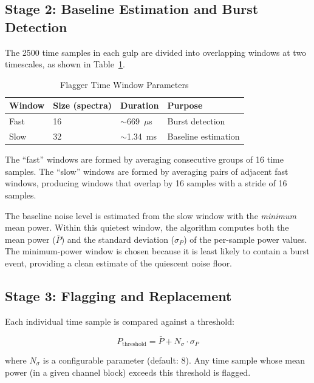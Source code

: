 \subsection{Stage 2: Baseline Estimation and Burst Detection}

The 2500 time samples in each gulp are divided into overlapping windows at two timescales, as shown in Table~\ref{tab:flagger-windows}.

\begin{table}[htbp]
    \centering
    \caption{Flagger Time Window Parameters}
    \label{tab:flagger-windows}
    \begin{tabular}{llll}
        \toprule
        \textbf{Window} & \textbf{Size (spectra)} & \textbf{Duration} & \textbf{Purpose} \\
        \midrule
        Fast & 16 & $\sim$669~$\mu$s & Burst detection \\
        Slow & 32 & $\sim$1.34~ms & Baseline estimation \\
        \bottomrule
    \end{tabular}
\end{table}

The ``fast'' windows are formed by averaging consecutive groups of 16 time samples. The ``slow'' windows are formed by averaging pairs of adjacent fast windows, producing windows that overlap by 16 samples with a stride of 16 samples.

The baseline noise level is estimated from the slow window with the \emph{minimum} mean power. Within this quietest window, the algorithm computes both the mean power ($\bar{P}$) and the standard deviation ($\sigma_P$) of the per-sample power values. The minimum-power window is chosen because it is least likely to contain a burst event, providing a clean estimate of the quiescent noise floor.

\subsection{Stage 3: Flagging and Replacement}

Each individual time sample is compared against a threshold:

\begin{equation}
    P_\mathrm{threshold} = \bar{P} + N_\sigma \cdot \sigma_P
    \label{eq:threshold}
\end{equation}

\noindent where $N_\sigma$ is a configurable parameter (default: 8). Any time sample whose mean power (in a given channel block) exceeds this threshold is flagged.

